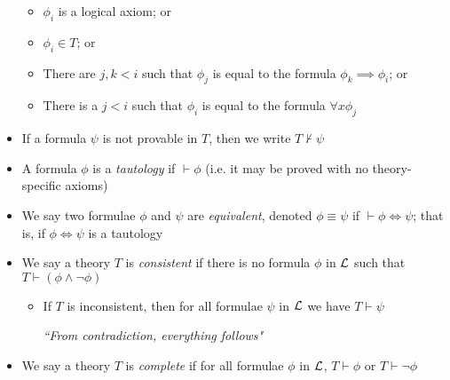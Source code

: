\begin{itemize}
	\begin{itemize}
		
		\item $ \phi_i $ is a logical axiom; or
		
		\item $ \phi_i \in T $; or
		
		\item There are $ j, k < i $ such that $ \phi_j $ is equal to the formula $ \phi_k \implies \phi_i $; or
		
		\item There is a $ j < i $ such that $ \phi_i $ is equal to the formula $ \forall x \phi_j $
		
	\end{itemize}

	\item If a formula $ \psi $ is not provable in $ T $, then we write $ T \nvdash \psi $
	
	\item A formula $ \phi $ is a \textit{tautology} if $ \vdash \phi $ (i.e. it may be proved with no theory-specific axioms)
	
	\item We say two formulae $ \phi $ and $ \psi $ are \textit{equivalent}, denoted $ \phi \equiv \psi $ if $ \vdash \phi \iff \psi $; that is, if $ \phi \iff \psi $ is a tautology
	
	\item We say a theory $ T $ is \textit{consistent} if there is no formula $ \phi $ in $ \mathcal{L} $ such that $ T \vdash (\phi \land \lnot \phi) $
	
	\begin{itemize}
		\item If $ T $ is inconsistent, then for all formulae $ \psi $ in $ \mathcal{L} $ we have $ T \vdash \psi $
		
		\subitem \textit{``From contradiction, everything follows"}
	\end{itemize}

	\item We say a theory $ T $ is \textit{complete} if for all formulae $ \phi $ in $ \mathcal{L} $, $ T \vdash \phi $ or $ T \vdash \lnot \phi $	
	
\end{itemize}